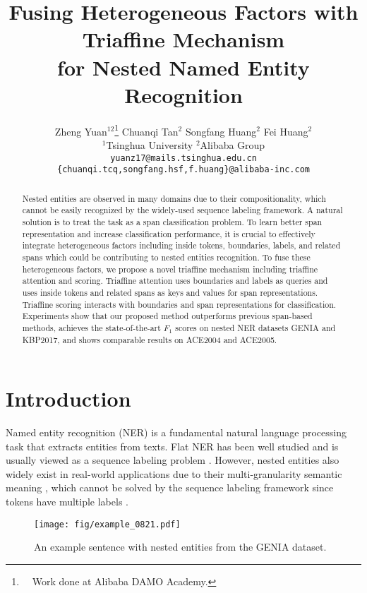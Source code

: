\documentclass[11pt]{article}
\title{Fusing Heterogeneous Factors with Triaffine Mechanism \\ for Nested Named Entity Recognition}
\author{
Zheng Yuan$^{12}$\thanks{$\quad$Work done at Alibaba DAMO Academy.} \space\space\space
Chuanqi Tan$^{2}$ \space\space
Songfang Huang$^{2}$ \space\space
Fei Huang$^{2}$\\
$^{1}$Tsinghua University \space\space\space\space
$^{2}$Alibaba Group\\
\texttt{yuanz17@mails.tsinghua.edu.cn}\\
\texttt{\{chuanqi.tcq,songfang.hsf,f.huang\}@alibaba-inc.com}
}
\begin{document}
\maketitle
\begin{abstract}
Nested entities are observed in many domains due to their compositionality, which cannot be easily recognized by the widely-used sequence labeling framework.
A natural solution is to treat the task as a span classification problem.
To learn better span representation and increase classification performance, it is crucial to effectively integrate heterogeneous factors including inside tokens, boundaries, labels, and related spans which could be contributing to nested entities recognition.
To fuse these heterogeneous factors, we propose a novel triaffine mechanism including triaffine attention and scoring.
Triaffine attention uses boundaries and labels as queries and uses inside tokens and related spans as keys and values for span representations.
Triaffine scoring interacts with boundaries and span representations for classification.
Experiments show that our proposed method outperforms previous span-based methods, achieves the state-of-the-art $F_1$ scores on nested NER datasets GENIA and KBP2017, and shows comparable results on ACE2004 and ACE2005.
\end{abstract}

\section{Introduction}

Named entity recognition (NER) is a fundamental natural language processing task that extracts entities from texts.
Flat NER has been well studied and is usually viewed as a sequence labeling problem \cite{lample2016neural}. However, nested entities also widely exist in real-world applications due to their multi-granularity semantic meaning \cite{alex2007recognising, yuan2020unsupervised},
which cannot be solved by the sequence labeling framework since tokens have multiple labels \cite{finkel2009nested}.

\begin{figure}[t]
\centering
\texttt{[image: fig/example\_0821.pdf]}
\caption{An example sentence with nested entities from the GENIA dataset.}
\label{fig:example}
\end{figure}
\end{document}
